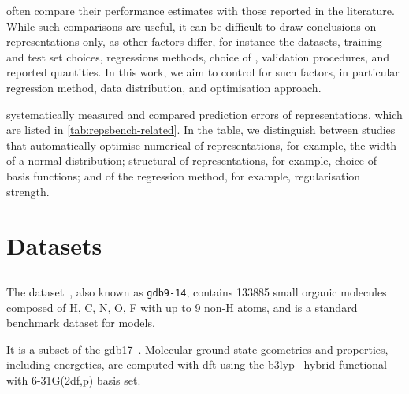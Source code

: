  often compare their performance estimates with those reported in the literature.
While such comparisons are useful, it can be difficult to draw conclusions on representations only, as other factors differ, for instance the
datasets, training and test set choices, regressions methods, choice of \hps, validation procedures, and reported quantities.
In this work, we aim to control for such factors, in particular regression method, data distribution, and \hp optimisation approach. 

 systematically measured and compared prediction errors of representations, which are listed in \cref{tab:repsbench-related}.
In the table, we distinguish between studies that automatically optimise
numerical \hps of representations, for example, the width of a normal distribution;
structural \hps of representations, for example, choice of basis functions;
and \hps of the regression method, for example, regularisation strength.

\section{Datasets}

\subsection{\dsgdb}

The \dsgdb{} dataset~\cite{rdrl2014q,rdrl2015q}, also known as \texttt{gdb9-14}, contains \num{133885} small organic molecules composed of H, C, N, O, F with up to 9 non-H atoms, and is a standard benchmark dataset for \ml models.

It is a subset of the \gls{gdb17}~\cite{rdbr2012q}.
Molecular ground state geometries and properties, including energetics, are computed with \gls{dft} using the \gls{b3lyp}~\cite{sdcf1994q} hybrid functional with 6-31G(2df,p) basis set.

